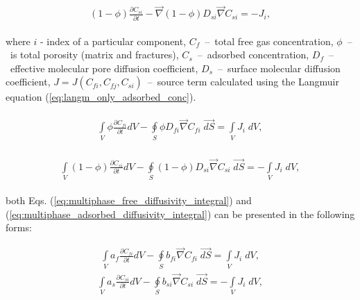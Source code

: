 \documentclass[a4paper,14pt,english]{extreport}
\begin{document}
\begin{eqnarray}
\begin{gathered}
\label{eq:multiphase_adsorbed_diffusivity_differential}
\left(1-\phi\right) \frac{\partial C_{si}}{\partial t}  - \vec{\nabla} \left(1-\phi\right) D_{si} \vec{\nabla}C_{si} = -J_i,
\end{gathered}
\end{eqnarray}

where $i$ - index of  a particular component, $C_{f}$~--~total free gas concentration, $\phi$~--~is total porosity (matrix and fractures), $C_{s}$~--~adsorbed concentration, $D_{f}$~--~effective molecular pore diffusion coefficient, $D_{s}$~--~surface molecular diffusion coefficient, $J=J\left(C_{fi}, C_{fj}, C_{si} \right)$~--~source term calculated using the Langmuir equation (\ref{eq:langm_only_adsorbed_conc}).

\begin{eqnarray}
\begin{gathered}
\label{eq:multiphase_free_diffusivity_integral}
\int \limits_{V} \phi \frac{\partial C_{fi}}{\partial t} dV  - \oint \limits_{S} \phi D_{fi} \vec{\nabla}C_{fi} \; \vec{dS} = \int \limits_{V} J_i \; dV,
\end{gathered}
\end{eqnarray}

\begin{eqnarray}
\begin{gathered}
\label{eq:multiphase_adsorbed_diffusivity_integral}
\int \limits_{V} \left(1-\phi\right) \frac{\partial C_{si}}{\partial t} dV - \oint \limits_{S} \left(1-\phi\right) D_{si} \vec{\nabla}C_{si} \; \vec{dS} = -\int \limits_{V}J_i \; dV,
\end{gathered}
\end{eqnarray}

both Eqs. (\ref{eq:multiphase_free_diffusivity_integral}) and (\ref{eq:multiphase_adsorbed_diffusivity_integral}) can be presented in the following forms:

\begin{eqnarray}
\label{eq:multiphase_diffusivity_simplified_integral}
\int \limits_{V} a_{f} \frac{\partial C_{fi}}{\partial t} dV - \oint \limits_{S} b_{fi} \vec{\nabla}C_{fi} \; \vec{dS} = \int \limits_{V} J_{i} \; dV,
\end{eqnarray}
\begin{eqnarray}
\label{eq:multiphase_diffusivity_simplified_integral}
\int \limits_{V} a_{s} \frac{\partial C_{si}}{\partial t} dV - \oint \limits_{S} b_{si} \vec{\nabla}C_{si} \; \vec{dS} = -\int \limits_{V} J_{i} \; dV,
\end{eqnarray}
\end{document}
